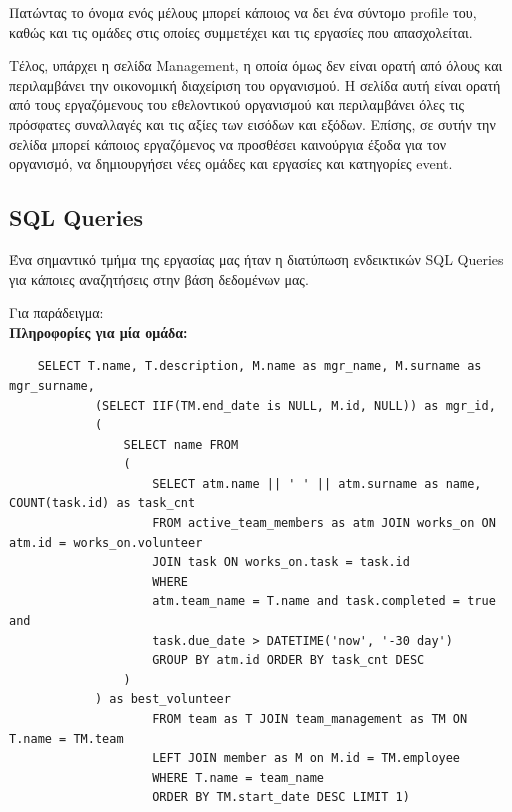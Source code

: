 \documentclass[manuscript,screen,review]{acmart}
\newcommand{\en}[1]{\foreignlanguage{english}{#1}}
\begin{document}
Πατώντας το όνομα ενός μέλους μπορεί κάποιος να δει ένα σύντομο \en{profile} του, καθώς και τις ομάδες στις οποίες συμμετέχει και τις εργασίες που απασχολείται.

Τέλος, υπάρχει η σελίδα \en{Management}, η οποία όμως δεν είναι ορατή από όλους και περιλαμβάνει την οικονομική διαχείριση του οργανισμού. Η σελίδα αυτή είναι ορατή από τους εργαζόμενους του εθελοντικού οργανισμού και περιλαμβάνει όλες τις πρόσφατες συναλλαγές και τις αξίες των εισόδων και εξόδων. Επίσης, σε συτήν την σελίδα μπορεί κάποιος εργαζόμενος να προσθέσει καινούργια έξοδα για τον οργανισμό, να δημιουργήσει νέες ομάδες και εργασίες και κατηγορίες \en{event}. 



\subsection{\en{SQL Queries}}
Ένα σημαντικό τμήμα της εργασίας μας ήταν η διατύπωση ενδεικτικών \en{SQL Queries} για κάποιες αναζητήσεις στην βάση δεδομένων μας.

Για παράδειγμα:\\
\textbf{Πληροφορίες για μία ομάδα:}
    
    \begin{lstlisting}
    SELECT T.name, T.description, M.name as mgr_name, M.surname as mgr_surname, 
            (SELECT IIF(TM.end_date is NULL, M.id, NULL)) as mgr_id, 
            (
                SELECT name FROM 
                (
                    SELECT atm.name || ' ' || atm.surname as name, COUNT(task.id) as task_cnt 
                    FROM active_team_members as atm JOIN works_on ON atm.id = works_on.volunteer 
                    JOIN task ON works_on.task = task.id
                    WHERE 
                    atm.team_name = T.name and task.completed = true and
                    task.due_date > DATETIME('now', '-30 day')
                    GROUP BY atm.id ORDER BY task_cnt DESC
                )
            ) as best_volunteer
                    FROM team as T JOIN team_management as TM ON T.name = TM.team
                    LEFT JOIN member as M on M.id = TM.employee
                    WHERE T.name = team_name
                    ORDER BY TM.start_date DESC LIMIT 1)
    
    \end{lstlisting}
        
\end{document}
